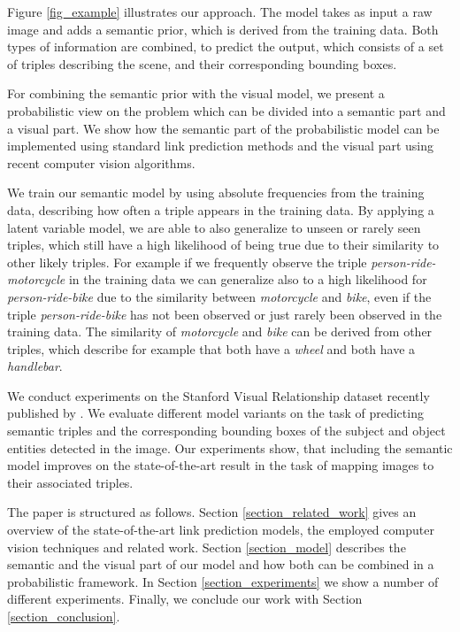 \documentclass[runningheads,a4paper]{llncs}
\begin{document}
Figure \ref{fig_example} illustrates our approach. The model takes as input a raw image and adds a semantic prior, which is derived from the training data. Both types of information are combined, to predict the output, which consists of a set of triples describing the scene, and their corresponding bounding boxes.

For combining the semantic prior with the visual model, we present a probabilistic view on the problem which can be divided into a semantic part and a visual part. We show how the semantic part of the probabilistic model can be implemented using standard link prediction methods and the visual part using recent computer vision algorithms.

We train our semantic model by using absolute frequencies from the training data, describing how often a triple appears in the training data. By applying a latent variable model, we are able to also generalize to unseen or rarely seen triples, which still have a high likelihood of being true due to their similarity to other likely triples. For example if we frequently observe the triple \textit{person-ride-motorcycle} in the training data we can generalize also to a high likelihood for \textit{person-ride-bike} due to the similarity between \textit{motorcycle} and \textit{bike}, even if the triple \textit{person-ride-bike} has not been observed or just rarely been observed in the training data. The similarity of \textit{motorcycle} and \textit{bike} can be derived from other triples, which describe for example that both have a \textit{wheel} and both have a \textit{handlebar}.

We conduct experiments on the Stanford Visual Relationship dataset recently published by \cite{visual}. We evaluate different model variants on the task of predicting semantic triples and the corresponding bounding boxes of the subject and object entities detected in the image. Our experiments show, that including the semantic model improves on the state-of-the-art result in the task of mapping images to their associated triples.

The paper is structured as follows. Section \ref{section_related_work} gives an overview of the state-of-the-art link prediction models, the employed computer vision techniques and related work. Section \ref{section_model} describes the semantic and the visual part of our model and how both can be combined in a probabilistic framework. In Section \ref{section_experiments} we show a number of different experiments. Finally, we conclude our work with Section \ref{section_conclusion}.
\end{document}
